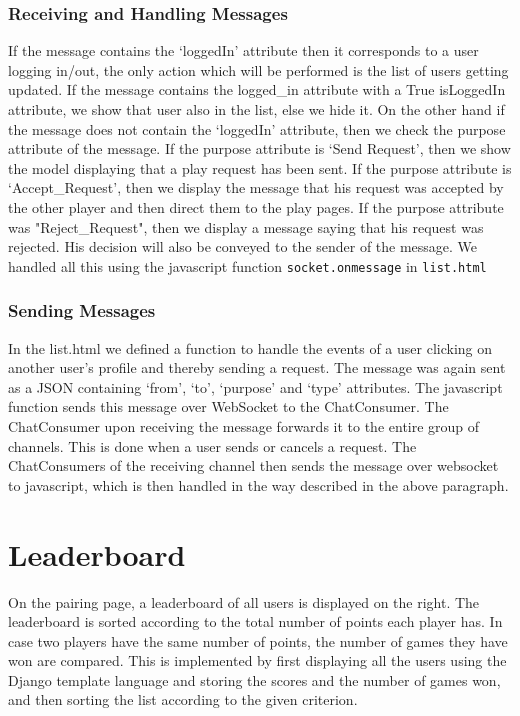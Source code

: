 \documentclass[titlepage]{article}
\begin{document}
\subsubsection{Receiving and Handling Messages}
If the message contains the `loggedIn' attribute then it corresponds to a user logging in/out, the only action which will be performed is the list of users getting updated. If the message contains the logged\_in attribute with a True isLoggedIn attribute, we show that user also in the list, else we hide it.  On the other hand if the message does not contain the `loggedIn' attribute, then we check the purpose attribute of the message. If the purpose attribute is `Send Request', then we show the model displaying that a play request has been sent. If the purpose attribute is `Accept\_Request', then we display the message that his request was accepted by the other player and then direct them to the play pages. If the purpose attribute was "Reject\_Request", then we display a message saying that his request was rejected.  His decision will also be conveyed to the sender of the message. We handled all this using the javascript function \texttt{socket.onmessage} in \texttt{list.html}

\subsubsection{Sending Messages}
In the list.html we defined a function to handle the events of a user clicking on another user's profile and thereby sending a request. The message was again sent as a JSON containing `from', `to', `purpose' and `type' attributes. The javascript function sends this message over WebSocket to the ChatConsumer. The ChatConsumer upon receiving the message forwards it to the entire group of channels. This is done when a user sends or cancels a request. The ChatConsumers of the receiving channel then sends the message over websocket to javascript, which is then handled in the way described in the above paragraph.
\section{Leaderboard}
On the pairing page, a leaderboard of all users is displayed on the right. The leaderboard is sorted according to the total number of points each player has. In case two players have the same number of points, the number of games they have won are compared. This is implemented by first displaying all the users using the Django template language and storing the scores and the number of games won, and then sorting the list according to the given criterion.
\end{document}
